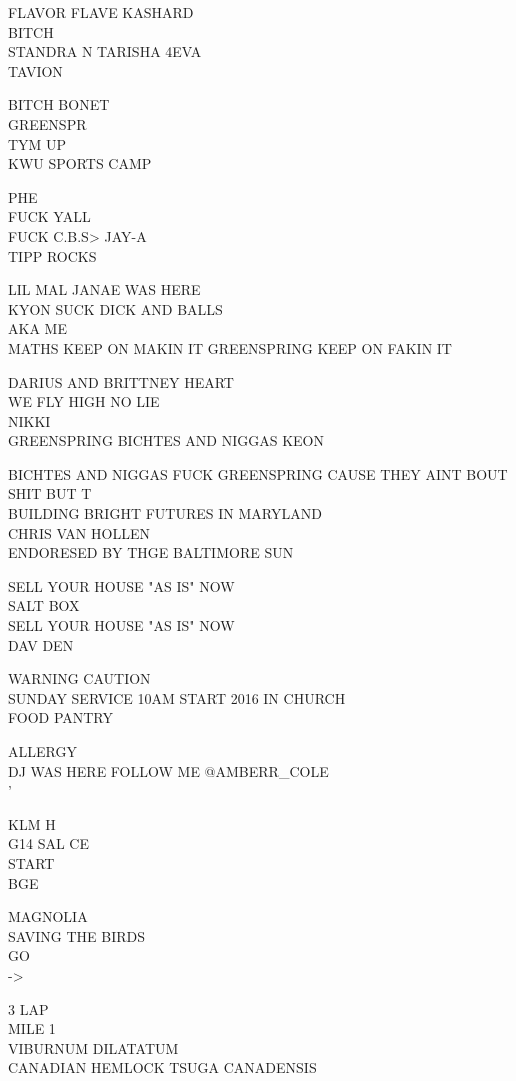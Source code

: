 \documentclass[10pt,letterpaper]{article}
\begin{document}
FLAVOR FLAVE KASHARD\\
BITCH\\
STANDRA N TARISHA 4EVA\\
TAVION

BITCH BONET\\
GREENSPR\\
TYM UP\\
KWU SPORTS CAMP

PHE\\
FUCK YALL\\
FUCK C.B.S> JAY{-}A\\
TIPP ROCKS

LIL MAL JANAE WAS HERE\\
KYON SUCK DICK AND BALLS\\
AKA ME\\
MATHS KEEP ON MAKIN IT GREENSPRING KEEP ON FAKIN IT

DARIUS AND BRITTNEY HEART\\
WE FLY HIGH NO LIE\\
NIKKI\\
GREENSPRING BICHTES AND NIGGAS KEON

BICHTES AND NIGGAS FUCK GREENSPRING CAUSE THEY AINT BOUT SHIT BUT T\\
BUILDING BRIGHT FUTURES IN MARYLAND\\
CHRIS VAN HOLLEN\\
ENDORESED BY THGE BALTIMORE SUN

SELL YOUR HOUSE "AS IS" NOW\\
SALT BOX\\
SELL YOUR HOUSE "AS IS" NOW\\
DAV DEN

WARNING CAUTION\\
SUNDAY SERVICE 10AM START 2016 IN CHURCH\\
FOOD PANTRY

ALLERGY\\
DJ WAS HERE FOLLOW ME @AMBERR\_COLE\\
'

KLM H\\
G14 SAL CE\\
START\\
BGE

MAGNOLIA\\
SAVING THE BIRDS\\
GO\\
{-}>

3 LAP\\
MILE 1\\
VIBURNUM DILATATUM\\
CANADIAN HEMLOCK TSUGA CANADENSIS
\end{document}
